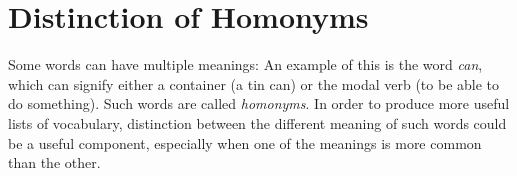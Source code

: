 \section{Distinction of Homonyms}
Some words can have multiple meanings:
An example of this is the word \textit{can}, which can signify either a container (a tin can) or the modal verb (to be able to do something).
Such words are called \textit{homonyms}.
In order to produce more useful lists of vocabulary, distinction between the different meaning of such words could be a useful component, especially when one of the meanings is more common than the other.











